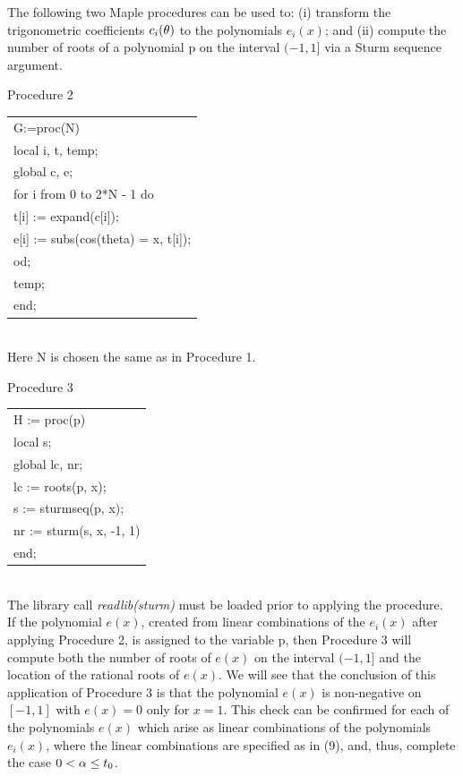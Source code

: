 The following two Maple procedures can be used to: (i) transform the
trigonometric coefficients $c_i(\theta)$ to the polynomials $e_i(x)$; and
(ii) compute the number of roots of a polynomial {\sf p} on the interval
$(-1,1]$ via a Sturm sequence argument.
\vspace{8pt}

\begin{center} Procedure 2 \end{center}
\vspace{8pt}

{\sf \begin{tabular}{l}
G:=proc(N)\\
local i, t, temp;\\
global c, e;\\
\indent for i from 0 to 2*N - 1 do\\
\indent\indent t[i] := expand(c[i]);\\
\indent\indent e[i] := subs(cos(theta) = x, t[i]);\\
\indent od;\\
\indent temp;\\
end;\\
\end{tabular}}\\

\noindent Here {\sf N} is chosen the same as in Procedure 1.\\

\begin{center} Procedure 3 \end{center}
\vspace{8pt}

{\sf \begin{tabular}{l}
H := proc(p)\\
local s;\\
global lc, nr;\\
\indent lc := roots(p, x);\\
\indent s := sturmseq(p, x);\\
\indent nr := sturm(s, x, -1, 1)\\
end;\\
\end{tabular}}\\

\noindent The library call {\em readlib(sturm)} must be loaded prior
to applying the procedure.\\

If the polynomial $e(x)$, created from linear combinations of the
$e_i(x)$ after applying Procedure 2, is assigned to the variable {\sf
p}, then Procedure 3 will compute both the number of roots of $e(x)$
on the interval $(-1,1]$ and the location of the rational roots of
$e(x)$.  We will see that the conclusion of this application of
Procedure 3 is that the polynomial $e(x)$ is non-negative on $[-1,1]$
with $e(x)=0$ only for $x=1$.  This check can be confirmed for each
of the polynomials $e(x)$ which arise as linear combinations of the
polynomials $e_i(x)$, where the linear combinations are specified as
in (9), and, thus, complete the case $0<\alpha\leq t_0$.

